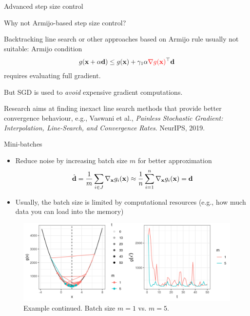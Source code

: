 \documentclass[11pt,compress,t,notes=noshow, xcolor=table]{beamer}
\begin{document}
\begin{vbframe}{Advanced step size control} 

\begin{blocki}{Why not Armijo-based step size control? }
    \item Backtracking line search or other approaches based on Armijo rule usually not suitable: Armijo condition 
    $$
          g(\mathbf{x} + \alpha \mathbf{d}) \le g(\mathbf{x}) + \gamma_1 \alpha \textcolor{red}{\nabla g(\mathbf{x})}^\top \mathbf{d}
    $$
    requires evaluating full gradient.
    \item But SGD is used to \emph{avoid} expensive gradient computations. 
    \item Research aims at finding inexact line search methods that provide better convergence behaviour, e.g., Vaswani et al., \emph{Painless Stochastic Gradient: Interpolation, Line-Search, and Convergence Rates}. NeurIPS, 2019.
\end{blocki}

\end{vbframe}


\begin{vbframe}{Mini-batches}

\begin{itemize}
	\item Reduce noise by increasing batch size $m$ for better approximation
	$$
		\hat{\mathbf{d}} = \frac{1}{m} \sum_{i \in J} \nabla_{\mathbf{x}} g_i(\mathbf{x}) \approx \frac{1}{n} \sum\limits_{i=1}^n \nabla_{\mathbf{x}} g_i(\mathbf{x}) = \mathbf{d} 
	$$
	\item Usually, the batch size is limited by computational resources (e.g., how much data you can load into the memory)
\end{itemize}

 	\begin{figure}
 		\vspace{-0.3cm}
 		\centering
 		\includegraphics[width = 1\textwidth]{figure_man/sgd_example_batch_size.png} \newline
		Example continued. Batch size $m = 1$ vs. $m = 5$. 
 	\end{figure}

\end{vbframe}
\end{document}
